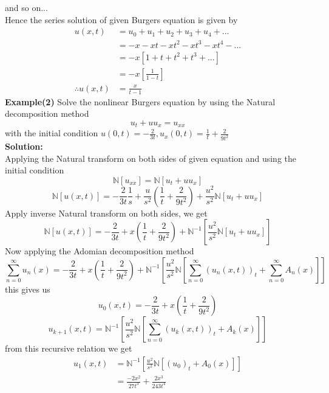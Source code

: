 and so on...\\
Hence the series solution of given Burgers equation is given by
\begin{align*}
u(x,t)&= u_{0}+u_{1}+u_{2}+u_{3}+u_{4}+...\\
&= -x-xt-xt^2-xt^3-xt^4-...\\
&=-x[1+t+t^2+t^3+...]\\
&=-x[\frac{1}{1-t}]\\
\therefore u(x,t)&=\frac{x}{t-1}
\end{align*}
\textbf{Example(2)} Solve the nonlinear Burgers equation by using the Natural decomposition method
\begin{equation*}
  u_{t}+uu_{x}=u_{xx}
 \end{equation*}
with the initial condition $u(0,t)=-\frac{2}{3t} , u_{x}(0,t)=\frac{1}{t}+\frac{2}{9t^2}$\\
 \textbf{Solution:}\\
 Applying the Natural transform on both sides of given equation and using the initial condition
\begin{equation*}
\mathbb{N}[u_{xx}]=\mathbb{N}[u_{t}+uu_{x}]
\end{equation*}
\begin{equation*}
\mathbb{N}[u(x,t)]=-\frac{2}{3t}\frac{1}{s}+\frac{u}{s^2}(\frac{1}{t}+\frac{2}{9t^2})+\frac{u^2}{s^2}\mathbb{N}[u_{t}+uu_{x}]
\end{equation*}
Apply inverse Natural transform on both sides, we get
\begin{equation*}
\mathbb{N}[u(x,t)]=-\frac{2}{3t}+x(\frac{1}{t}+\frac{2}{9t^2})+\mathbb{N}^{-1}[\frac{u^2}{s^2}\mathbb{N}[u_{t}+uu_{x}]]
\end{equation*}
Now applying the Adomian decomposition method
\begin{equation}
\sum_{n=0}^{\infty} u_{n}(x)=-\frac{2}{3t}+x(\frac{1}{t}+\frac{2}{9t^2})+\mathbb{N}^{-1}[\frac{u^2}{s^2}\mathbb{N}[\sum_{n=0}^{\infty} (u_{n}(x,t))_{t}+\sum_{n=0}^{\infty} A_{n}(x)]]
\end{equation}
this gives us
\begin{equation*}
u_{0}(x,t)= -\frac{2}{3t}+x(\frac{1}{t}+\frac{2}{9t^2}) 
\end{equation*}
\begin{equation*}
u_{k+1}(x,t) = \mathbb{N}^{-1}[\frac{u^2}{s^2}\mathbb{N}[\sum_{n=0}^{\infty} (u_{k}(x,t))_{t}+ A_{k}(x)]]
\end{equation*}
from this recursive relation we get
\begin{align*}
u_{1}(x,t)&=\mathbb{N}^{-1}[\frac{u^2}{s^2}\mathbb{N}[(u_{0})_{t}+ A_{0}(x)]]\\
&= \frac{-2x^2}{27t^3}+\frac{2x^3}{243t^4}
\end{align*}
